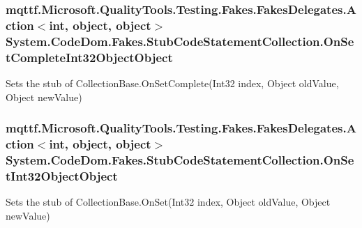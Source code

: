 \hypertarget{class_system_1_1_code_dom_1_1_fakes_1_1_stub_code_statement_collection_a7d6e5739fa2024033d680e4c3061ab79}{
\subsubsection[{On\-Set\-Complete\-Int32\-Object\-Object}]{\setlength{\rightskip}{0pt plus 5cm}mqttf.\-Microsoft.\-Quality\-Tools.\-Testing.\-Fakes.\-Fakes\-Delegates.\-Action$<$int, object, object$>$ System.\-Code\-Dom.\-Fakes.\-Stub\-Code\-Statement\-Collection.\-On\-Set\-Complete\-Int32\-Object\-Object}}\label{class_system_1_1_code_dom_1_1_fakes_1_1_stub_code_statement_collection_a7d6e5739fa2024033d680e4c3061ab79}


Sets the stub of Collection\-Base.\-On\-Set\-Complete(\-Int32 index, Object old\-Value, Object new\-Value)

\hypertarget{class_system_1_1_code_dom_1_1_fakes_1_1_stub_code_statement_collection_a697a7305b01626311f04e0c452c8b9d8}{
\subsubsection[{On\-Set\-Int32\-Object\-Object}]{\setlength{\rightskip}{0pt plus 5cm}mqttf.\-Microsoft.\-Quality\-Tools.\-Testing.\-Fakes.\-Fakes\-Delegates.\-Action$<$int, object, object$>$ System.\-Code\-Dom.\-Fakes.\-Stub\-Code\-Statement\-Collection.\-On\-Set\-Int32\-Object\-Object}}\label{class_system_1_1_code_dom_1_1_fakes_1_1_stub_code_statement_collection_a697a7305b01626311f04e0c452c8b9d8}


Sets the stub of Collection\-Base.\-On\-Set(\-Int32 index, Object old\-Value, Object new\-Value)

